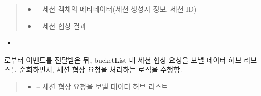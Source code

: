 \documentclass[a4paper,10pt,english]{sphinxmanual}
\begin{document}
\begin{fulllineitems}
\begin{fulllineitems}
\begin{quote}
\begin{description}
\begin{itemize}
\item {} 
\sphinxAtStartPar
{} – 세션 객체의 메타데이터(세션 생성자 정보, 세션 ID)

\item {} 
\sphinxAtStartPar
{} – 세션 협상 결과

\end{itemize}

\end{description}\end{quote}


\nopagebreak

\begin{itemize}
\item {} 
\sphinxAtStartPar
{\hyperref[\detokenize{_SessionManager:SessionManager._srListener}]{}}

\end{itemize}



\end{fulllineitems}


\begin{fulllineitems}
\label{\detokenize{_SessionRequester:SessionRequester._snProcess}}
\pysigstartsignatures
{}
\pysigstopsignatures
\sphinxAtStartPar
{\hyperref[\detokenize{_SessionManager:sessionmanager}]{}} 로부터  이벤트를 전달받은 뒤,
bucketList 내 세션 협상 요청을 보낼 데이터 허브 리브스틀 순회하면서, 세션 협상 요청을 처리하는 로직을 수행함.
\begin{quote}\begin{description}
\begin{itemize}
\item {} 
\sphinxAtStartPar
{} – 세션 협상 요청을 보낼 데이터 허브 리스트

\end{itemize}


\end{description}
\end{quote}
\end{fulllineitems}
\end{fulllineitems}
\end{document}
